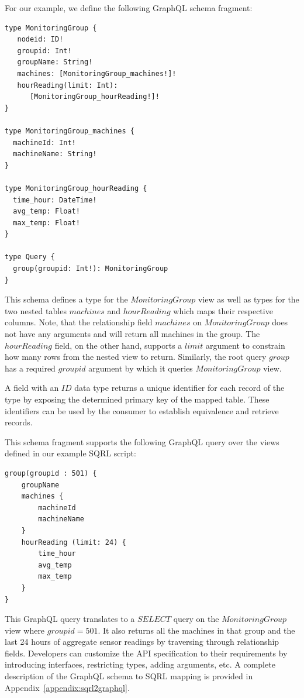 \documentclass[	DIV=calc,%
							paper=letter,%
							fontsize=11pt,%
							twocolumn]{scrartcl}	 					%
\begin{document}
For our example, we define the following GraphQL schema fragment:
\begin{lstlisting}
type MonitoringGroup {
   nodeid: ID!
   groupid: Int!
   groupName: String!
   machines: [MonitoringGroup_machines!]!
   hourReading(limit: Int):
      [MonitoringGroup_hourReading!]!
}

type MonitoringGroup_machines {
  machineId: Int!
  machineName: String!
}

type MonitoringGroup_hourReading {
  time_hour: DateTime!
  avg_temp: Float!
  max_temp: Float!
}

type Query {
  group(groupid: Int!): MonitoringGroup
}
\end{lstlisting}

This schema defines a type for the $MonitoringGroup$ view as well as types for the two nested tables $machines$ and $hourReading$ which maps their respective columns. Note, that the relationship field $machines$ on $MonitoringGroup$ does not have any arguments and will return all machines in the group. The $hourReading$ field, on the other hand, supports a $limit$ argument to constrain how many rows from the nested view to return. Similarly, the root query $group$ has a required $groupid$ argument by which it queries $MonitoringGroup$ view.

A field with an $ID$ data type returns a unique identifier for each record of the type by exposing the determined primary key of the mapped table. These identifiers can be used by the consumer to establish equivalence and retrieve records.

This schema fragment supports the following GraphQL query over the views defined in our example SQRL script:

\begin{lstlisting}
group(groupid : 501) {
    groupName
    machines {
        machineId
        machineName
    }
    hourReading (limit: 24) {
        time_hour
        avg_temp
        max_temp
    }
}
\end{lstlisting}

This GraphQL query translates to a $SELECT$ query on the $MonitoringGroup$ view where $groupid = 501$. It also returns all the machines in that group and the last 24 hours of aggregate sensor readings by traversing through relationship fields. Developers can customize the API specification to their requirements by introducing interfaces, restricting types, adding arguments, etc. A complete description of the GraphQL schema to SQRL mapping is provided in Appendix~\ref{appendix:sqrl2graphql}.
\end{document}
